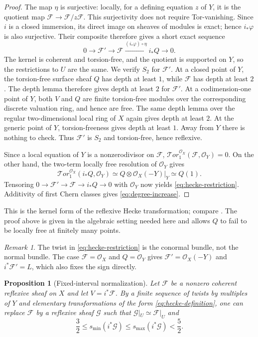\documentclass[11pt,reqno]{amsart}
\numberwithin{equation}{section}
\newtheorem{proposition}[theorem]{Proposition}
\theoremstyle{definition}
\theoremstyle{remark}
\newtheorem{remark}[theorem]{Remark}
\newcommand{\OO}{\mathcal O}
\newcommand{\FF}{\mathcal F}
\newcommand{\GG}{\mathcal G}
\newcommand{\Tor}{\mathcal{T}or}
\newcommand{\smax}{s_{\max}}
\newcommand{\smin}{s_{\min}}
\begin{document}
\begin{proof}
The map $\eta$ is surjective: locally, for a defining equation $z$ of
$Y$, it is the quotient map $\FF\to\FF/z\FF$. This surjectivity does
not require Tor-vanishing. Since $i$ is a closed immersion, its direct
image on sheaves of modules is exact; hence $i_*\varphi$ is also
surjective. Their composite therefore gives a short exact sequence
\[
 0\longrightarrow\FF'\longrightarrow\FF
   \xrightarrow{(i_*\varphi)\circ\eta}i_*Q\longrightarrow0.
\]
The kernel is coherent and torsion-free, and the quotient is supported
on $Y$, so the restrictions to $U$ are the same. We verify $S_2$ for
$\FF'$.
At a closed point of $Y$, the torsion-free surface sheaf $Q$ has depth
at least $1$, while $\FF$ has depth at least $2$. The depth lemma
therefore gives depth at least $2$ for $\FF'$. At a codimension-one
point of $Y$, both $V$ and $Q$ are finite torsion-free modules over the
corresponding discrete valuation ring, and hence are free. The same depth lemma over the regular two-dimensional
local ring of $X$ again gives depth at least $2$. At the generic point
of $Y$, torsion-freeness gives depth at least $1$. Away from $Y$ there
is nothing to check. Thus $\FF'$ is $S_2$ and torsion-free, hence
reflexive.

Since a local equation of $Y$ is a nonzerodivisor on $\FF$,
$\Tor_1^{\OO_X}(\FF,\OO_Y)=0$. On the other hand, the two-term
locally free resolution of $\OO_Y$ gives
\[
 \Tor_1^{\OO_X}(i_*Q,\OO_Y)
       \simeq Q\otimes\OO_X(-Y)|_Y\simeq Q(1).
\]
Tensoring $0\to\FF'\to\FF\to i_*Q\to0$ with $\OO_Y$ now yields
\eqref{eq:hecke-restriction}. Additivity of first Chern classes gives
\eqref{eq:degree-increase}.
\end{proof}

This is the kernel form of the reflexive Hecke transformation;
compare \cite[Lemmas 2.2 and 2.4 and Proposition 2.6]{ChenSun2020}.
The proof above is given in the algebraic setting needed here and allows
$Q$ to fail to be locally free at finitely many points.

\begin{remark}\label{rem:sign}
The twist in \eqref{eq:hecke-restriction} is the conormal bundle, not
the normal bundle. The case $\FF=\OO_X$ and $Q=\OO_Y$ gives
$\FF'=\OO_X(-Y)$ and $i^*\FF'=L$, which also fixes the sign directly.
\end{remark}

\begin{proposition}[Fixed-interval normalization]\label{prop:normalization}
Let $\FF$ be a nonzero coherent reflexive sheaf on $X$ and let
$V=i^*\FF$. By a finite sequence of twists by multiples of $Y$ and
elementary transformations of the form \eqref{eq:hecke-definition},
one can replace $\FF$ by a reflexive sheaf $\GG$ such that
$\GG|_U\simeq\FF|_U$ and
\begin{equation}\label{eq:normalized-interval}
 \frac32\leq\smin(i^*\GG)\leq\smax(i^*\GG)<\frac52.
\end{equation}
\end{proposition}
\end{document}
